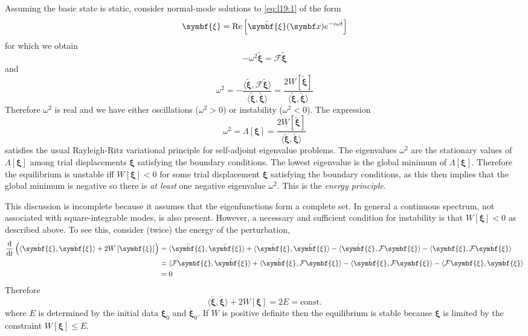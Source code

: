 \documentclass{jknotes}
\newcommand{\disp}{\symbf{\xi}}
\begin{document}
Assuming the basic state is static, consider normal-mode solutions to
\eqref{eq:l19:1} of the form
\begin{equation}
	\disp = \Re\left[ \tilde{\disp}(\x) e^{-i\omega t}\right]
\end{equation}
for which we obtain
\begin{equation}
	-\omega^2 \tilde{\disp} = \mathcal{F} \tilde{\disp}
\end{equation}
and
\begin{equation}
	\omega^2 = -\frac{\langle \tilde{\disp}, \mathcal{F} \tilde{\disp}
	\rangle}{\langle \tilde{\disp}, \tilde{\disp} \rangle} =
	\frac{2W\left[\tilde{\disp}\right]}{\langle \tilde{\disp},
		\tilde{\disp}\rangle}
\end{equation}
Therefore $\omega^2$ is real and we have either oscillations ($\omega^2 > 0$)
or instability ($\omega^2 < 0$). The expression
\begin{equation}
	\omega^2 = \Lambda\left[\disp\right] = 
	\frac{2W\left[\tilde{\disp}\right]}{\langle \tilde{\disp},
		\tilde{\disp}\rangle}
\end{equation}
satisfies the usual Rayleigh-Ritz variational principle for self-adjoint
eigenvalue problems. The eigenvalues $\omega^2$ are the stationary values of
$\Lambda\left[\disp\right]$ among trial displacements $\disp$ satisfying the
boundary conditions. The lowest eigenvalue is the global minimum of
$\Lambda\left[\disp\right]$. Therefore the equilibrium is unstable iff
$W\left[\disp\right] < 0$ for some trial displacement $\disp$ satisfying the
boundary conditions, as this then implies that the global minimum is negative
so there is \emph{at least} one negative eigenvalue $\omega^2$. This is the
\emph{energy principle}. 

This discussion is incomplete because it assumes that the eigenfunctions form
a complete set. In general a continuous spectrum, not associated with
square-integrable modes, is also present. However, a necessary and sufficient
condition for instability is that $W\left[\disp\right] < 0$ as described
above. To see this, consider (twice) the energy of the perturbation,
\begin{align}
	\frac{\diffd}{\diffd t} \left( \langle \dot{\disp},\dot{\disp}\rangle +
	2W\left[\disp\right]\right) &= \langle \ddot{\disp},\dot{\disp}\rangle +
	\langle \dot{\disp}, \ddot{\disp}\rangle - \langle \dot{\disp},
	\mathcal{F} \disp \rangle - \langle \disp, \mathcal{F}\dot{\disp}\rangle
	\\
								&= \langle \mathcal{F}\disp, \dot{\disp}\rangle
								+ \langle \dot{\disp},\mathcal{F}\disp\rangle
								- \langle \dot{\disp}, \mathcal{F}\disp
								\rangle - \langle \mathcal{F} \disp,
								\dot{\disp}\rangle \\
								&= 0
\end{align}
Therefore
\begin{equation}
	\langle \dot{\disp},\dot{\disp}\rangle + 2W\left[\disp\right] = 2E =
	\text{const.}
\end{equation}
where $E$ is determined by the initial data $\disp_0$ and $\dot{\disp}_0$. If
$W$ is positive definite then the equilibrium is stable because $\disp$ is
limited by the constraint $W\left[\disp\right] \le E$. 
\end{document}
